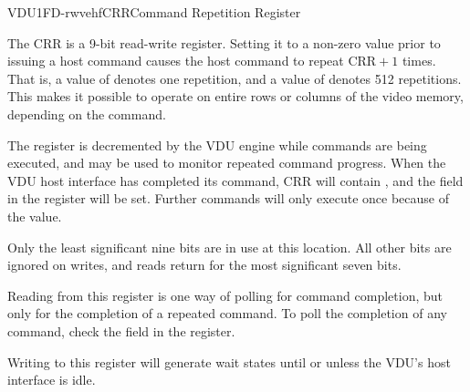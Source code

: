\begin{ioport}{VDU}{1FD}{-rwvehf}{CRR}{Command Repetition Register}

  The CRR is a 9-bit read-write register. Setting it to a non-zero value prior
  to issuing a host command causes the host command to repeat $\mbox{CRR}+1$
  times. That is, a value of  denotes one repetition, and a value of
   denotes 512 repetitions. This makes it possible to operate on
  entire rows or columns of the video memory, depending on the command.

  The register is decremented by the VDU engine while commands are being
  executed, and may be used to monitor repeated command progress. When the VDU
  host interface has completed its command, CRR will contain , and the
   field in the  register will be set. Further commands
  will only execute once because of the  value.

  \begin{cbitfield}[8]
  \end{cbitfield}

  Only the least significant nine bits are in use at this location. All other
  bits are ignored on writes, and reads return  for the most
  significant seven bits.

  Reading from this register is one way of polling for command completion, but
  only for the completion of a repeated command. To poll the completion of any
  command, check the  field in the  register.

  Writing to this register will generate wait states until or unless the VDU's
  host interface is idle.

\end{ioport}


